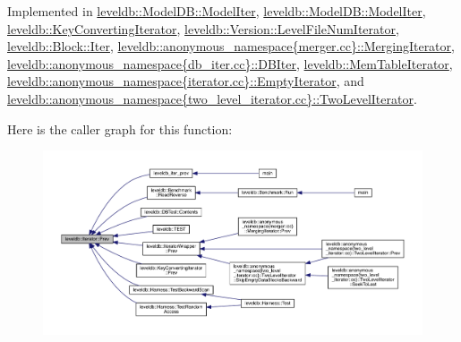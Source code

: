Implemented in \hyperlink{classleveldb_1_1_model_d_b_1_1_model_iter_acf667aa8d5e11d6acc16134959e43c40}{leveldb\+::\+Model\+D\+B\+::\+Model\+Iter}, \hyperlink{classleveldb_1_1_model_d_b_1_1_model_iter_acf667aa8d5e11d6acc16134959e43c40}{leveldb\+::\+Model\+D\+B\+::\+Model\+Iter}, \hyperlink{classleveldb_1_1_key_converting_iterator_adff607836b7b3d117a524b3d440bc55a}{leveldb\+::\+Key\+Converting\+Iterator}, \hyperlink{classleveldb_1_1_version_1_1_level_file_num_iterator_ab39c60a98d579590231034fdb665cb42}{leveldb\+::\+Version\+::\+Level\+File\+Num\+Iterator}, \hyperlink{classleveldb_1_1_block_1_1_iter_a096747ff77d5090579fe4cd4e464a3c9}{leveldb\+::\+Block\+::\+Iter}, \hyperlink{classleveldb_1_1anonymous__namespace_02merger_8cc_03_1_1_merging_iterator_a90b2ef85503b85f4cd400c677fefcbd4}{leveldb\+::anonymous\+\_\+namespace\{merger.\+cc\}\+::\+Merging\+Iterator}, \hyperlink{classleveldb_1_1anonymous__namespace_02db__iter_8cc_03_1_1_d_b_iter_a57bffd756f2824a053e9c95d793e815e}{leveldb\+::anonymous\+\_\+namespace\{db\+\_\+iter.\+cc\}\+::\+D\+B\+Iter}, \hyperlink{classleveldb_1_1_mem_table_iterator_a61f8a385b268158a1e7bd0cba29a83c1}{leveldb\+::\+Mem\+Table\+Iterator}, \hyperlink{classleveldb_1_1anonymous__namespace_02iterator_8cc_03_1_1_empty_iterator_a8f6baac3690f2b97442e6d4c4b33a3ad}{leveldb\+::anonymous\+\_\+namespace\{iterator.\+cc\}\+::\+Empty\+Iterator}, and \hyperlink{classleveldb_1_1anonymous__namespace_02two__level__iterator_8cc_03_1_1_two_level_iterator_ac5fe263fa573ba6fa3bb0a4754eb5aad}{leveldb\+::anonymous\+\_\+namespace\{two\+\_\+level\+\_\+iterator.\+cc\}\+::\+Two\+Level\+Iterator}.



Here is the caller graph for this function\+:
\nopagebreak
\begin{figure}[H]
\begin{center}
\leavevmode
\includegraphics[width=350pt]{classleveldb_1_1_iterator_a28798d802a203788587dc6adc5bc729e_icgraph}
\end{center}
\end{figure}


